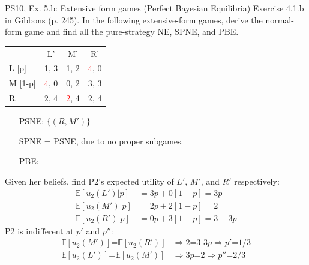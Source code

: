 \begin{frame}{PS10, Ex. 5.b: Extensive form games (Perfect Bayesian Equilibria)}
    Exercise 4.1.b in Gibbons (p. 245). In the following extensive-form games, derive the normal-form game and find all the pure-strategy NE, SPNE, and PBE.
    \vspace{-10pt}
    \begin{multicols}{2}
      \begin{table}
        \begin{tabular}{l|c|c|c|}
          \multicolumn{1}{c}{} & \multicolumn{1}{c}{L'} & \multicolumn{1}{c}{M'} & \multicolumn{1}{c}{R'} \\\cline{2-4}
          L [p]   & 1, \color{blue}3 & 1, 2 & \textcolor{red}{4}, 0 \\\cline{2-4}
          M [1-p] & \textcolor{red}{4}, 0 & 0, 2 & 3, \color{blue}3 \\\cline{2-4}
          R       & 2, \color{blue}4 & \textcolor{red}{2}, \color{blue}4 & 2, \color{blue}4 \\\cline{2-4}
        \end{tabular}
      \end{table} \vspace{-12pt}
      \begin{itemize}
        \item[PSNE:] $\{(R,M')\}$
        \item[SPNE =] PSNE, due to no proper subgames.
        \item[PBE:]
      \end{itemize} \vspace{-10pt}
      Given her beliefs, find P2's expected utility of $L'$, $M'$, and $R'$ respectively: \vspace{-7pt}
      \begin{align*}
        \mathbb{E}[u_2(L')|p]&=3p+0[1-p]=3p\\
        \mathbb{E}[u_2(M')|p]&=2p+2[1-p]=2\\
        \mathbb{E}[u_2(R')|p]&=0p+3[1-p]=3-3p
      \end{align*}
      P2 is indifferent at $p'$ and $p''$: \vspace{-7pt}
      \begin{align*}
        \mathbb{E}[u_2(M')]\text{=}\mathbb{E}[u_2(R')]&\Rightarrow 2\text{=3-3}p\Rightarrow p'\text{=}1/3\\
        \mathbb{E}[u_2(L')]\text{=}\mathbb{E}[u_2(M')]&\Rightarrow 3p\text{=}2\Rightarrow p''\text{=}2/3
      \end{align*}

\end{multicols}
\end{frame}
